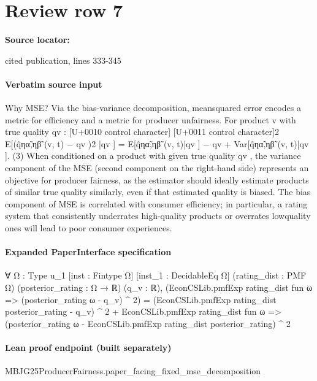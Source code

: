 \documentclass[10pt]{article}
\begin{document}
\section*{Review row 7}
\textbf{Source locator:} {\footnotesize\raggedright cited publication, lines 333-\allowbreak{}345\par}
\paragraph{Verbatim source input}
\begin{ReviewVerbatim}
Why MSE? Via the bias-variance decomposition, meansquared error encodes a metric for efficiency and a metric
for producer unfairness. For product v with true quality qv :
[U+0010 control character]
[U+0011 control character]2
E[(q̂ηα̃,ηβ̃ (v, t) − qv )2 |qv ] = E[q̂ηα̃,ηβ̃ (v, t)|qv ] − qv
+ Var[q̂ηα̃,ηβ̃ (v, t)|qv ].
(3)
When conditioned on a product with given true quality
qv , the variance component of the MSE (second component
on the right-hand side) represents an objective for producer
fairness, as the estimator should ideally estimate products
of similar true quality similarly, even if that estimated quality is biased. The bias component of MSE is correlated with
consumer efficiency; in particular, a rating system that consistently underrates high-quality products or overrates lowquality ones will lead to poor consumer experiences.
\end{ReviewVerbatim}


\paragraph{Expanded PaperInterface specification}
\begin{ReviewVerbatim}
∀ {Ω : Type u_1} [inst : Fintype Ω] [inst_1 : DecidableEq Ω] (rating_dist : PMF Ω) (posterior_rating : Ω → ℝ) (q_v : ℝ),
  (EconCSLib.pmfExp rating_dist fun ω => (posterior_rating ω - q_v) ^ 2) =
    (EconCSLib.pmfExp rating_dist posterior_rating - q_v) ^ 2 +
      EconCSLib.pmfExp rating_dist fun ω => (posterior_rating ω - EconCSLib.pmfExp rating_dist posterior_rating) ^ 2
\end{ReviewVerbatim}

\paragraph{Lean proof endpoint (built separately)}\begin{ReviewVerbatim}
MBJG25ProducerFairness.paper_facing_fixed_mse_decomposition
\end{ReviewVerbatim}
\end{document}
